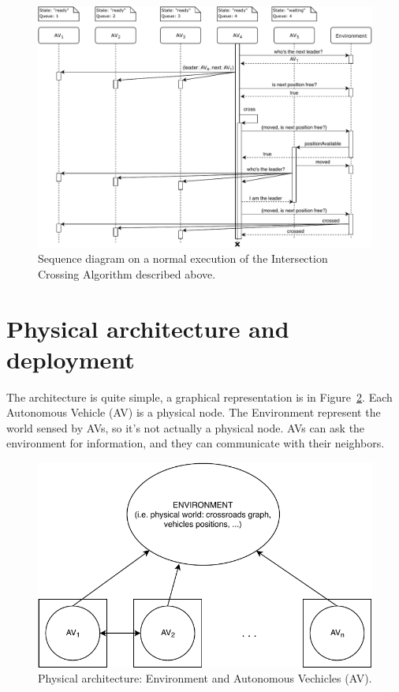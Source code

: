 \documentclass{memoir}
\begin{document}
\begin{figure}
	\centering
	\includegraphics[width=\linewidth]{sequence_diagrams/crossing_intersection.pdf}
	\caption{Sequence diagram on a normal execution of the Intersection Crossing Algorithm described above.}
	\label{fig:seq-diag-crossing-intersection}
\end{figure}

\section{Physical architecture and deployment}
The architecture is quite simple, a graphical representation is in Figure~\ref{fig:physical-architecture}. Each Autonomous Vehicle (AV) is a physical node. The Environment represent the world sensed by AVs, so it's not actually a physical node. AVs can ask the environment for information, and they can communicate with their neighbors.

\begin{figure}
	\centering
	\includegraphics[width=0.8\linewidth]{physical_architecture.pdf}
	\caption{Physical architecture: Environment and Autonomous Vechicles (AV).}
	\label{fig:physical-architecture}
\end{figure}
\end{document}
